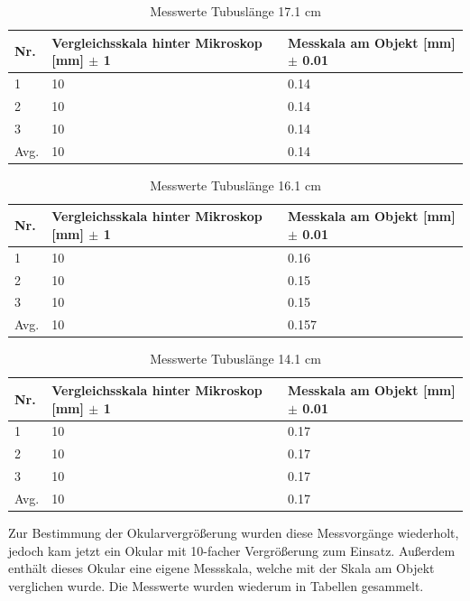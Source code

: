 \documentclass[12pt,a4paper,twoside]{article}
\begin{document}
\begin{table}[H]
    \centering
    \caption{Messwerte Tubuslänge 17.1 cm}
    \label{tab:messwerteTB17}
    \begin{tabular}{| l | l | l |}
        \hline
        Nr.   & Vergleichsskala hinter Mikroskop [mm] $\pm$ 1 & Messkala am Objekt [mm] $\pm$ 0.01 \\
        \hline
        1 & 10 & 0.14 \\
        2 & 10 & 0.14 \\
        3 & 10 & 0.14 \\
        \hline
        Avg. & 10 & 0.14 \\
        \hline
    \end{tabular}
\end{table}

\begin{table}[H]
    \centering
    \caption{Messwerte Tubuslänge 16.1 cm}
    \label{tab:messwerteTB16}
    \begin{tabular}{| l | l | l |}
        \hline
        Nr.   & Vergleichsskala hinter Mikroskop [mm] $\pm$ 1 & Messkala am Objekt [mm] $\pm$ 0.01\\
        \hline
        1 & 10 & 0.16 \\
        2 & 10 & 0.15 \\
        3 & 10 & 0.15 \\
        \hline
        Avg. & 10 & 0.157 \\
        \hline
    \end{tabular}
\end{table}

\begin{table}[H]
    \centering
    \caption{Messwerte Tubuslänge 14.1 cm}
    \label{tab:messwerteTB14}
    \begin{tabular}{| l | l | l |}
        \hline
        Nr.   & Vergleichsskala hinter Mikroskop [mm] $\pm$ 1 & Messkala am Objekt [mm] $\pm$ 0.01 \\
        \hline
        1 & 10 & 0.17 \\
        2 & 10 & 0.17 \\
        3 & 10 & 0.17 \\
        \hline
        Avg. & 10 & 0.17 \\
        \hline
    \end{tabular}
\end{table}

\noindent
Zur Bestimmung der Okularvergrößerung wurden diese Messvorgänge wiederholt, jedoch kam jetzt ein Okular mit 10-facher Vergrößerung zum Einsatz. 
Außerdem enthält dieses Okular eine eigene Messskala, welche mit der Skala am Objekt verglichen wurde.
Die Messwerte wurden wiederum in Tabellen gesammelt.
\end{document}
